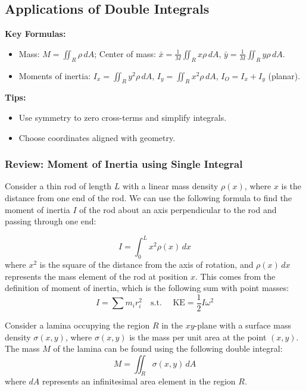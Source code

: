 \documentclass[11pt]{report}
\begin{document}
\subsection{Applications of Double Integrals}

\begin{keybox}
	\textbf{Key Formulas:}
\begin{itemize}
    \item Mass: $M=\iint_R \rho\,dA$; Center of mass: $\bar x=\frac{1}{M}\iint_R x\rho\,dA$, $\bar y=\frac{1}{M}\iint_R y\rho\,dA$.
    \item Moments of inertia: $I_x=\iint_R y^2\rho\,dA$, $I_y=\iint_R x^2\rho\,dA$, $I_O=I_x+I_y$ (planar).
\end{itemize}
	\textbf{Tips:}
\begin{itemize}
    \item Use symmetry to zero cross-terms and simplify integrals.
    \item Choose coordinates aligned with geometry.
\end{itemize}
\end{keybox}
\begin{shaded}
    \subsubsection*{Review: Moment of Inertia using Single Integral}

    Consider a thin rod of length $L$ with a linear mass density $\rho(x)$, where $x$ is the distance from one end of the rod. We can use the following formula to find the moment of inertia $I$ of the rod about an axis perpendicular to the rod and passing through one end:

    \begin{equation}
        I = \int_0^L x^2 \rho(x) \, dx
    \end{equation}
    where $x^2$ is the square of the distance from the axis of rotation, and $\rho(x) \, dx$ represents the mass element of the rod at position $x$. This comes from the definition of moment of inertia, which is the following sum with point masses:
    $$        
    I = \sum m_i r_i^2 \quad \text{s.t. } \quad \text{KE}= \frac{1}{2} I \omega^2
    $$
\end{shaded}

\begin{definition}
    Consider a lamina occupying the region $R$ in the $xy$-plane with a surface mass density $\sigma(x,y)$, where $\sigma(x,y)$ is the mass per unit area at the point $(x,y)$. The mass $M$ of the lamina can be found using the following double integral:
    \begin{equation}
        M = \iint_R \sigma(x,y) \, dA
    \end{equation}
    where $dA$ represents an infinitesimal area element in the region $R$.
    
\end{definition}
\end{document}
